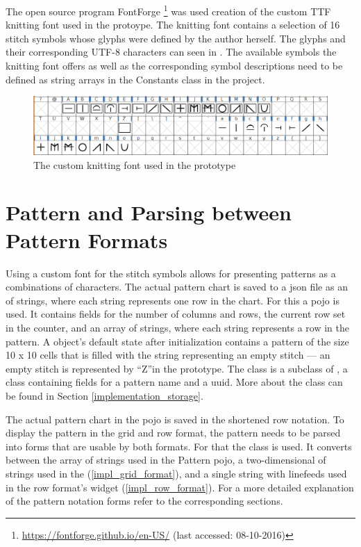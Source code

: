 The open source program FontForge \footnote{\url{https://fontforge.github.io/en-US/} (last accessed: 08-10-2016)} was used creation of the custom \gls{TTF} knitting font used in the protoype. The knitting font contains a selection of 16 stitch symbols whose glyphs were defined by the author herself. The glyphs and their corresponding UTF-8 characters can seen in . The available symbols the knitting font offers as well as the corresponding symbol descriptions need to be defined as string arrays in the Constants class in the project.

\begin{figure}[H]
  \centering
  \includegraphics[width=.7\textwidth]{images/OwnKnittingFont_Chart.png}
  \caption[The custom knitting font used in the prototype \protect{}]{The custom knitting font used in the prototype} 
  \label{fig:own_knitting_font} 
\end{figure}

\section{Pattern and Parsing between Pattern Formats}
Using a custom font for the stitch symbols allows for presenting patterns as a combinations of characters. The actual pattern chart is saved to a \gls{json} file as an  of strings, where each string represents one row in the chart. For this a  \gls{pojo} is used. It contains fields for the number of columns and rows, the current row set in the counter, and an array of strings, where each string represents a row in the pattern. A  object’s default state after initialization contains a pattern of the size 10 x 10  cells that is filled with the string representing an empty stitch --- an empty stitch is represented by ``Z''in the prototype. The class  is a subclass of , a class containing fields for a pattern name and a \gls{uuid}. More about the  class can be found in Section \ref{implementation_storage}.

The actual pattern chart in the  \gls{pojo} is saved in the shortened row notation. To display the pattern in the grid and row format, the pattern needs to be parsed into forms that are usable by both formats. For that the class  is used. It converts between the array of strings used in the Pattern \gls{pojo}, a two-dimensional  of strings used in the  (\ref{impl_grid_format}), and a single string with linefeeds used in the row format's  widget (\ref{impl_row_format}). For a more detailed explanation of the pattern notation forms refer to the corresponding sections.

